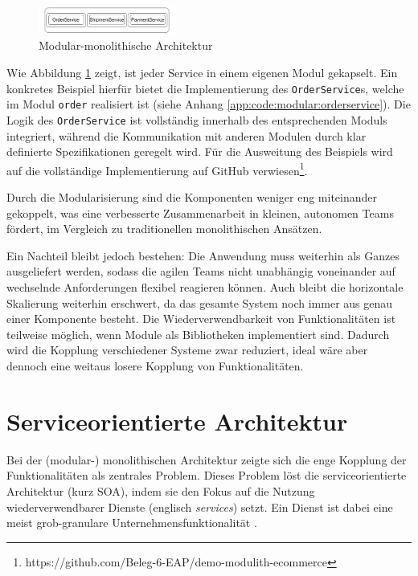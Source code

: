 \documentclass[acmtog]{acmart}
\begin{document}
\begin{figure}[h!]
  \centering
  \includegraphics[width=0.4\textwidth]{images/mono/mono-example.pdf}
  \caption{Modular-monolithische Architektur}
  \label{fig:modular-mono}
\end{figure}

Wie Abbildung \ref{fig:modular-mono} zeigt, ist jeder Service in einem eigenen Modul gekapselt.
Ein konkretes Beispiel hierfür bietet die Implementierung des \texttt{OrderService}s, welche im Modul \texttt{order}
realisiert ist (siehe Anhang \ref{app:code:modular:orderservice}). Die Logik des \texttt{OrderService} ist vollständig
innerhalb des entsprechenden Moduls integriert, während die Kommunikation mit anderen Modulen durch klar definierte
Spezifikationen geregelt wird.
Für die Ausweitung des Beispiels wird auf die vollständige Implementierung auf GitHub verwiesen\footnote{https://github.com/Beleg-6-EAP/demo-modulith-ecommerce}.

Durch die Modularisierung sind die Komponenten weniger eng miteinander gekoppelt, was eine
verbesserte Zusammenarbeit in kleinen, autonomen Teams fördert, im Vergleich zu traditionellen
monolithischen Ansätzen.

Ein Nachteil bleibt jedoch bestehen: Die Anwendung muss weiterhin als Ganzes ausgeliefert werden,
sodass die agilen Teams nicht unabhängig voneinander auf wechselnde Anforderungen flexibel reagieren können.
Auch bleibt die horizontale Skalierung weiterhin erschwert, da das gesamte System noch immer aus genau einer Komponente besteht.
Die Wiederverwendbarkeit von Funktionalitäten ist teilweise möglich, wenn Module als Bibliotheken implementiert sind.
Dadurch wird die Kopplung verschiedener Systeme zwar reduziert, ideal wäre aber dennoch eine weitaus losere Kopplung von Funktionalitäten.

\section{Serviceorientierte Architektur}
\label{sec:soa}
Bei der (modular-) monolithischen Architektur zeigte sich die enge Kopplung der Funktionalitäten als zentrales Problem.
Dieses Problem löst die serviceorientierte Architektur (kurz SOA), indem sie den Fokus auf die Nutzung wiederverwendbarer Dienste (englisch \textit{services}) setzt.
Ein Dienst ist dabei eine meist grob-granulare Unternehmensfunktionalität \cite{soa4}.
\end{document}
